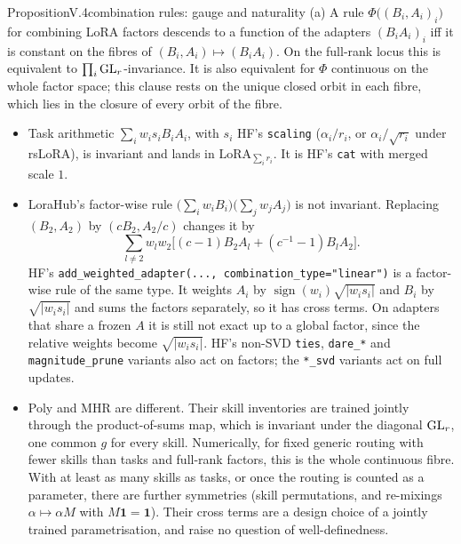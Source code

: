 \begin{restate}{Proposition}{V.4}{combination rules: gauge and naturality}
(a) A rule $\Phi\big((B_i,A_i)_i\big)$ for combining LoRA factors descends to a function of the adapters $(B_iA_i)_i$ iff it
is constant on the fibres of $(B_i,A_i)\mapsto(B_iA_i)$. On the full-rank locus this is equivalent to
$\prod_i\mathrm{GL}_r$-invariance. It is also equivalent for $\Phi$ continuous on the whole factor space; this clause rests on the
unique closed orbit in each fibre, which lies in the closure of every orbit of the fibre.
\begin{itemize}
  \item Task arithmetic $\sum_iw_is_iB_iA_i$, with $s_i$ HF's \texttt{scaling} ($\alpha_i/r_i$, or $\alpha_i/\sqrt{r_i}$
  under rsLoRA), is invariant and lands in $\mathrm{LoRA}_{\sum_ir_i}$. It is HF's \texttt{cat} with merged scale $1$.
  \item LoraHub's factor-wise rule $\big(\sum_iw_iB_i\big)\big(\sum_jw_jA_j\big)$ is not invariant. Replacing $(B_2,A_2)$ by
  $(cB_2,A_2/c)$ changes it by
  \[\sum_{l\ne2}w_lw_2\big[(c-1)B_2A_l+(c^{-1}-1)B_lA_2\big].\]
  HF's \texttt{add\_\allowbreak weighted\_\allowbreak adapter(..., combination\_\allowbreak type="linear")} is a factor-wise
  rule of the same type. It weights $A_i$ by $\operatorname{sign}(w_i)\sqrt{\lvert w_is_i\rvert}$ and $B_i$ by
  $\sqrt{\lvert w_is_i\rvert}$ and sums the factors separately, so it has cross terms. On adapters that share a frozen $A$
  it is still not exact up to a global factor, since the relative weights become $\sqrt{\lvert w_is_i\rvert}$. HF's non-SVD
  \texttt{ties}, \texttt{dare\_*} and \texttt{magnitude\_prune} variants also act on factors; the \texttt{*\_svd} variants
  act on full updates.
  \item Poly and MHR are different. Their skill inventories are trained jointly through the product-of-sums map, which is
  invariant under the diagonal $\mathrm{GL}_r$, one common $g$ for every skill. Numerically, for fixed generic routing with fewer
  skills than tasks and full-rank factors, this is the whole continuous fibre. With at least as many skills as tasks, or
  once the routing is counted as a parameter, there are further symmetries (skill permutations, and re-mixings
  $\alpha\mapsto\alpha M$ with $M\mathbf 1=\mathbf 1$). Their cross terms are a design choice of a jointly trained
  parametrisation, and raise no question of well-definedness.
\end{itemize}


\end{restate}
